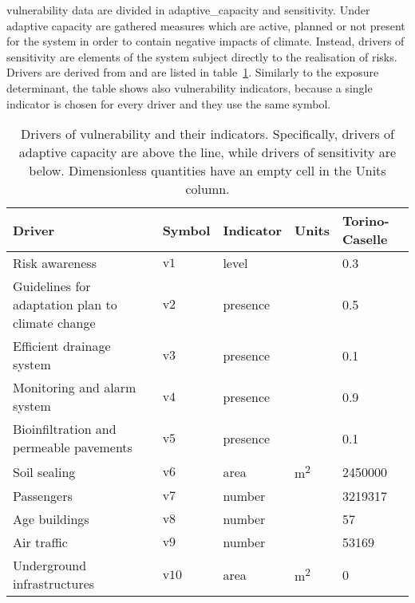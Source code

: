 \Gls{vulnerability} data are divided in \gls{adaptive_capacity} and \gls{sensitivity}. Under adaptive capacity are gathered measures which are active, planned or not present for the system in order to contain negative \glspl{impact} of climate. Instead, \glspl{driver} of sensitivity are elements of the system subject directly to the realisation of risks. Drivers are derived from \cite[555-556,558]{2022DeVivoRiskAssessment} and are listed in table~\ref{tab:drivers_vulnerability}. Similarly to the \gls{exposure} \gls{determinant}, the table shows also vulnerability \glspl{indicator}, because a single indicator is chosen for every driver and they use the same symbol.
\begin{table}[h]
  \centering
  \caption{Drivers of vulnerability and their indicators. Specifically, drivers of adaptive capacity are above the line, while drivers of sensitivity are below. Dimensionless quantities have an empty cell in the Units column.}
  \label{tab:drivers_vulnerability}
  \begin{tabular}{p{}llll}
    Driver                                           & Symbol         & Indicator & Units                & Torino-Caselle \\
    \hline
    Risk awareness                                   & $\mathrm{v1}$  & level     &                      & 0.3            \\
    Guidelines for adaptation plan to climate change & $\mathrm{v2}$  & presence  &                      & 0.5            \\
    Efficient drainage system                        & $\mathrm{v3}$  & presence  &                      & 0.1            \\
    Monitoring and alarm system                      & $\mathrm{v4}$  & presence  &                      & 0.9            \\
    Bioinfiltration and permeable pavements          & $\mathrm{v5}$  & presence  &                      & 0.1            \\
    \hline
    Soil sealing                                     & $\mathrm{v6}$  & area      & \unit{\square\metre} & 2450000        \\
    Passengers                                       & $\mathrm{v7}$  & number    &                      & 3219317        \\
    Age buildings                                    & $\mathrm{v8}$  & number    &                      & 57             \\
    Air traffic                                      & $\mathrm{v9}$  & number    &                      & 53169          \\
    Underground infrastructures                      & $\mathrm{v10}$ & area      & \unit{\square\metre} & 0              \\
    \end{tabular}
\end{table}

